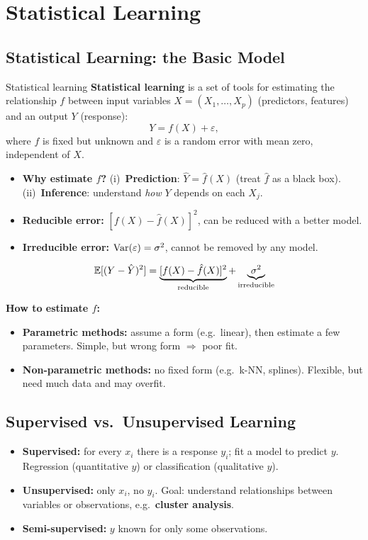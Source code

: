 \chapter{Statistical Learning}\label{n:stat}

\section{Statistical Learning: the Basic Model}

\begin{dfn}{Statistical learning}
\textbf{Statistical learning} is a set of tools for estimating the relationship $f$ between input variables $X=(X_1,\dots,X_p)$ (predictors, features) and an output $Y$ (response):
\[ Y=f(X)+\varepsilon, \]
where $f$ is fixed but unknown and $\varepsilon$ is a random error with mean zero, independent of $X$.
\end{dfn}

\begin{itemize}
  \item \textbf{Why estimate $f$?} (i)~\textbf{Prediction}: $\hat Y=\hat f(X)$ (treat $\hat f$ as a black box). (ii)~\textbf{Inference}: understand \emph{how} $Y$ depends on each $X_j$.
  \item \textbf{Reducible error:} $[f(X)-\hat f(X)]^2$, can be reduced with a better model.
  \item \textbf{Irreducible error:} $\operatorname{Var}(\varepsilon)=\sigma^2$, cannot be removed by any model.
\end{itemize}
\[ \mathbb{E}[(Y-\hat Y)^2]=\underbrace{[f(X)-\hat f(X)]^2}_{\text{reducible}}+\underbrace{\sigma^2}_{\text{irreducible}} \]

\textbf{How to estimate $f$:}
\begin{itemize}
  \item \textbf{Parametric methods:} assume a form (e.g.\ linear), then estimate a few parameters. Simple, but wrong form $\Rightarrow$ poor fit.
  \item \textbf{Non-parametric methods:} no fixed form (e.g.\ k-NN, splines). Flexible, but need much data and may overfit.
\end{itemize}

\section{Supervised vs.\ Unsupervised Learning}
\begin{itemize}
  \item \textbf{Supervised:} for every $x_i$ there is a response $y_i$; fit a model to predict $y$. Regression (quantitative $y$) or classification (qualitative $y$).
  \item \textbf{Unsupervised:} only $x_i$, no $y_i$. Goal: understand relationships between variables or observations, e.g.\ \textbf{cluster analysis}.
  \item \textbf{Semi-supervised:} $y$ known for only some observations.
\end{itemize}


